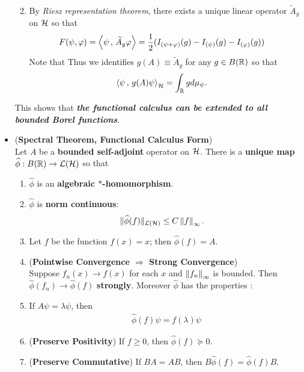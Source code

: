 \documentclass[11pt]{article}
\begin{document}
\begin{itemize}
\begin{remark}
\begin{enumerate}
\begin{align*}
\end{align*}
\item By \emph{Riesz representation theorem}, there exists a unique linear operator $\widetilde{A}_g$ on ${\mathcal H}$ so that 
\begin{align*}
F(\psi, \varphi) = \left\langle \psi\,,\, \widetilde{A}_{g}\varphi \right\rangle &= \frac{1}{2} ( I_{(\psi+\varphi)}(g) - I_{(\psi)}(g) -  I_{(\varphi)}(g) )
\end{align*} Note that  Thus we identifies $g(A) \equiv \widetilde{A}_g$ for any $g \in B({\mathbb R})$ so that
\begin{align*}
\left\langle \psi\,,\, g(A)\psi \right\rangle_{{\mathcal H}} &= \int_{{\mathbb R}} g d\mu_{\psi}.
\end{align*}
\end{enumerate}
This shows that \emph{\textbf{the functional calculus can be extended to all bounded Borel functions}}.
\end{remark}


\item 
\begin{theorem} (\textbf{Spectral Theorem, Functional Calculus Form})    \citep{reed1980methods}\\
Let $A$ be a \textbf{bounded self-adjoint} operator on ${\mathcal H}$. There is a \textbf{unique map} $\widehat{\phi}: B({\mathbb R}) \to {\mathcal L}({\mathcal H})$ so that 
\begin{enumerate}
\item  $\widehat{\phi}$ is an \textbf{algebraic $*$-homomorphism}. 
\item  $\widehat{\phi}$ is \textbf{norm continuous}: 
\begin{align*}
\|\widehat{\phi}(f)\|_{{\mathcal L}({\mathcal H})} &\le C \left\|f\right\|_{\infty}.
\end{align*}
\item  Let $f$ be the function $f(x) = x$; then $\widehat{\phi}(f) = A$. 
\item  (\textbf{Pointwise Convergence $\Rightarrow$ Strong Convergence})\\
Suppose $f_n(x) \rightarrow f(x)$ for each $x$ and $\left\|f_n\right\|_{\infty}$ is bounded. Then  $\widehat{\phi}(f_n) \to \widehat{\phi}(f)$ \textbf{strongly}. Moreover $\widehat{\phi}$ has the properties : 
\item  If $A\psi = \lambda \psi$, then 
\begin{align}
\widehat{\phi}(f)\psi  = f(\lambda) \psi  \label{eqn: cont_functional_calculas_spectral_decomp_ext}
\end{align} 
\item (\textbf{Preserve Positivity})  If $f \ge 0$, then $\widehat{\phi}(f) \succeq 0$. 
\item (\textbf{Preserve Commutative})  If $BA = AB$, then $B\widehat{\phi}(f) = \widehat{\phi}(f)B$. 
\end{enumerate}
\end{theorem}


\end{itemize}
\end{document}
